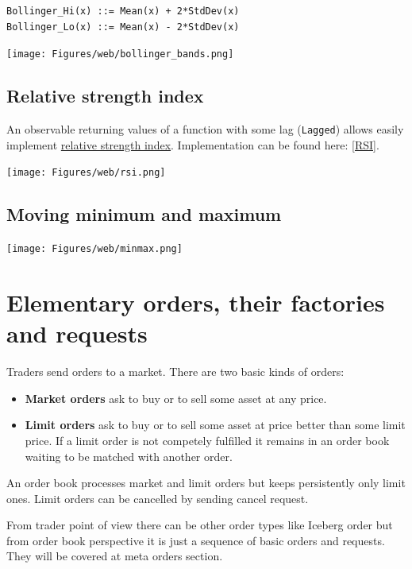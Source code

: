 \documentclass[a4paper,11pt]{article}
\begin{document}
\begin{verbatim}
Bollinger_Hi(x) ::= Mean(x) + 2*StdDev(x)
Bollinger_Lo(x) ::= Mean(x) - 2*StdDev(x)
\end{verbatim}

\centerline{\texttt{[image: Figures/web/bollinger\_bands.png]}}

\subsection{Relative strength index}\label{relative-strength-index}

An observable returning values of a function with some lag
(\texttt{Lagged}) allows easily implement
\href{http://en.wikipedia.org/wiki/Relative_strength_index}{relative
strength index}. Implementation can be found here: \ref{RSI}.

\centerline{\texttt{[image: Figures/web/rsi.png]}}

\subsection{Moving minimum and maximum}\label{moving-minimum-and-maximum}
\centerline{\texttt{[image: Figures/web/minmax.png]}}

\section{Elementary orders, their factories and
requests}\label{elementary-orders-their-factories-and-requests}

Traders send orders to a market. There are two basic kinds of orders:

\begin{itemize}
\itemsep1pt\parskip0pt
\item
  \textbf{Market orders} ask to buy or to sell some asset at any price.
\item
  \textbf{Limit orders} ask to buy or to sell some asset at price better
  than some limit price. If a limit order is not competely fulfilled it
  remains in an order book waiting to be matched with another order.
\end{itemize}

An order book processes market and limit orders but keeps persistently
only limit ones. Limit orders can be cancelled by sending cancel
request.

From trader point of view there can be other order types like
Iceberg order but from order book
perspective it is just a sequence of basic orders and requests. They
will be covered at meta orders section.
\end{document}
